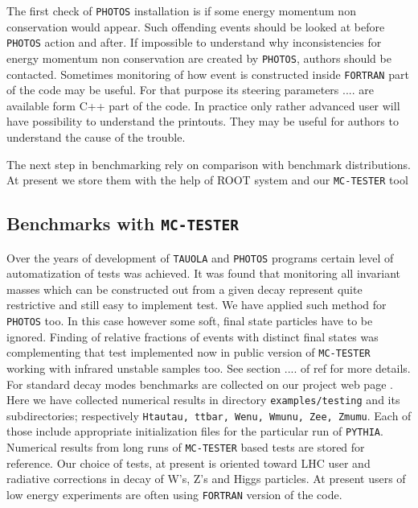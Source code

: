 \documentclass[]{Photos_interface_design}
\begin{document}
The first check of {\tt PHOTOS} installation is if some energy momentum non 
conservation would appear. Such offending events should be looked at
before {\tt PHOTOS} action and after.
If impossible to understand why inconsistencies for energy momentum non 
conservation are created by {\tt PHOTOS}, authors should be contacted. Sometimes
monitoring of how event is constructed inside {\tt FORTRAN} part of the code
may be useful. For that purpose its steering parameters .... are
available form C++ part of the code. In practice only rather
 advanced user will have possibility to understand the printouts. They may be 
useful for authors to understand the cause of the trouble.

The next step in benchmarking rely on comparison with benchmark distributions. 
At present we store them with the help of ROOT system and our {\tt MC-TESTER} tool



\subsection{Benchmarks with {\tt MC-TESTER}}
Over the years of development of {\tt TAUOLA} and {\tt PHOTOS} programs certain level 
of automatization of tests was achieved. It was found that monitoring all invariant masses which can be constructed out from a given decay represent 
quite restrictive and still easy to implement test. We have applied such method 
for {\tt PHOTOS} too. In this case however some soft, final state particles have to be ignored. Finding of relative fractions of events with distinct final states 
was complementing that test implemented now in public version of {\tt MC-TESTER}
working with infrared unstable samples too. See section .... of 
ref \cite{Davidson:2008ma} for more details. For standard decay modes benchmarks are collected on our project web page \cite{Photos_tests}.
Here we have collected numerical results in directory 
{\tt examples/testing} and its subdirectories; respectively  
{\tt Htautau, ttbar, Wenu, Wmunu, Zee, Zmumu}. Each of those include
appropriate initialization files for the particular run of {\tt PYTHIA}. Numerical results from long runs of {\tt MC-TESTER} based tests
are stored for reference. Our choice of tests, at present is oriented toward 
LHC user and radiative corrections in decay of W's, Z's and Higgs particles.
At present users of low energy experiments are often using {\tt FORTRAN} version 
of the code. 
\end{document}

